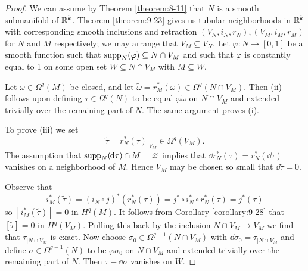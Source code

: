 \begin{proof}
  We can assume by Theorem \ref{theorem:8-11} that $N$ is a smooth submanifold of ${\mathbb{R}}^k$.
  Theorem \ref{theorem:9-23} gives us tubular neighborhoods in ${\mathbb{R}}^k$ with corresponding smooth
  inclusions and retraction $(V_N, i_N, r_N), (V_M, i_M, r_M)$ for $N$ and $M$ respectively;
  we may arrange that $V_M\subseteq V_N$. Let $\varphi:N\to [0, 1]$ be a smooth function such that 
  $\operatorname{supp}_N(\varphi)\subseteq N\cap V_M$ and such that $\varphi$ is constantly equal to 1 on some open 
  set $W\subseteq N\cap V_M$ with $M\subseteq W$.

  Let $\omega\in\Omega^q(M)$ be closed, and let $\widetilde{\omega}=r^*_M(\omega)\in\Omega^q(N\cap V_M)$. 
  Then (ii) follows upon defining $\tau\in\Omega^q(N)$ to be equal $\varphi\widetilde{\omega}$ on $N\cap V_M$ and 
  extended trivially over the remaining part of $N$. The same argument proves (i).

  To prove (iii) we set 
  \[
    \widetilde{\tau} = r^*_N(\tau)_{|V_M}\in\Omega^q(V_M).
  \]
  The assumption that $\supp_N(\!\dd\tau)\cap M=\ns$ implies that $\dd r_N^*(\tau)=r^*_N(\!\dd\tau)$ vanishes
  on a neighborhood of $M$. Hence $V_M$ may be chosen so small that $\dd\widetilde{\tau} = 0$.

  Observe that
  \[
    i^*_M(\widetilde{\tau}) = (i_N\circ j)^*(r^*_N(\tau)) = j^*\circ i^*_N\circ r^*_N(\tau) = j^*(\tau)
  \]
  so $[i^*_M(\widetilde{\tau})]=0$ in $H^q(M)$. It follows from Corollary \ref{corollary:9-28} that $[\widetilde{\tau}]=0$
  in $H^q(V_M)$. Pulling this back by the inclusion $N\cap V_M\to V_M$ we find that $\tau_{|N\cap V_M}$ is exact.
  Now choose $\sigma_0\in\Omega^{q-1}(N\cap V_M)$ with $\dd\sigma_0=\tau_{|N\cap V_M}$ and define $\sigma\in\Omega^{q-1}(N)$
  to be $\varphi\sigma_0$ on $N\cap V_M$ and extended trivially over the remaining part of $N$. Then $\tau-\dd\sigma$ vanishes 
  on $W$.
\end{proof}

